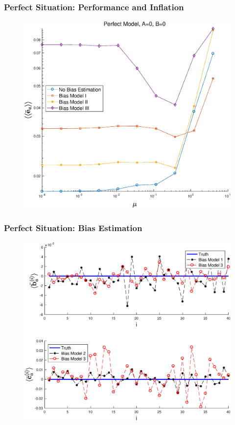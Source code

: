 \documentclass{beamer}
\begin{document}
\begin{frame}
\frametitle{Perfect Situation: Performance and Inflation}
\begin{figure} 
\centering
\includegraphics[scale=0.4]{Figures/AErrVsMuP1}
\end{figure}
\end{frame}

\begin{frame}
\frametitle{Perfect Situation: Bias Estimation}
\begin{figure} 
\centering
\includegraphics[scale=0.4]{Figures/BiasEstP1}
\end{figure}
\end{frame}
\end{document}
